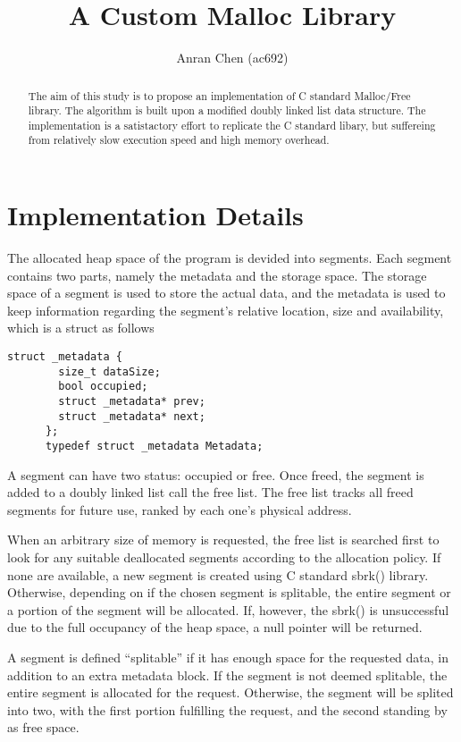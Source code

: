 \documentclass[12pt, letterpaper]{article}
\title{A Custom Malloc Library}
\author{Anran Chen (ac692)}
\date{}
\begin{document}
  \maketitle
  \begin{abstract}
    The aim of this study is to propose an implementation of C standard Malloc/Free library. 
    The algorithm is built upon a modified doubly linked list data structure. 
    The implementation is a satistactory effort to replicate the C standard libary, 
    but suffereing from relatively slow execution speed and high memory overhead. 
  \end{abstract}
  
  \section*{Implementation Details}
    The allocated heap space of the program is devided into segments. 
    Each segment contains two parts, namely the metadata and the storage space. 
    The storage space of a segment is used to store the actual data, 
    and the metadata is used to keep information regarding the segment's relative location, size and availability,
    which is a struct as follows


    \begin{lstlisting}[frame=single]
      struct _metadata {
        size_t dataSize;
        bool occupied;
        struct _metadata* prev;
        struct _metadata* next;
      };
      typedef struct _metadata Metadata;

    \end{lstlisting}

    A segment can have two status: occupied or free. 
    Once freed, the segment is added to a doubly linked list call the free list.
    The free list tracks all freed segments for future use, ranked by each one's physical address.

    When an arbitrary size of memory is requested, 
    the free list is searched first to look for any suitable deallocated segments according to the allocation policy.
    If none are available, a new segment is created using C standard sbrk() library. 
    Otherwise, depending on if the chosen segment is splitable, 
    the entire segment or a portion of the segment will be allocated.
    If, however, the sbrk() is unsuccessful due to the full occupancy of the heap space,
    a null pointer will be returned. 

    A segment is defined ``splitable'' if it has enough space for the requested data,
    in addition to an extra metadata block. If the segment is not deemed splitable,
    the entire segment is allocated for the request.
    Otherwise, the segment will be splited into two, 
    with the first portion fulfilling the request, and the second standing by as free space.
\end{document}
